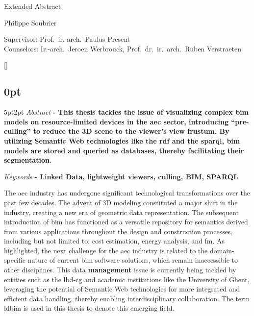 \begin{center}
    \sffamily
    \huge Extended Abstract

    \Large Philippe Soubrier

    \normalsize
    Supervisor: Prof.\ ir.-arch.\ Paulus Present\\
    Counselors: Ir.-arch.\ Jeroen Werbrouck, Prof.\ dr.\ ir.\ arch.\ Ruben Verstraeten
\end{center}
\begin{refsection}
    []{}
    \begin{multicols}{2}
        \small
        \titlespacing\subsection{0pt}{5pt}{2pt}
        \emph{Abstract} \textbf{
            - This thesis tackles the issue of visualizing complex \ac{bim} models on resource-limited devices in the \ac{aec} sector, introducing \enquote{pre-culling} to reduce the 3D scene to the viewer's view frustum. By utilizing Semantic Web technologies like the \ac{rdf} and the \ac{sparql}, \ac{bim} models are stored and queried as databases, thereby facilitating their segmentation.
        }

        \emph{Keywords} \textbf{
            - Linked Data, lightweight viewers, culling, BIM, SPARQL
        }

        The \ac{aec} industry has undergone significant technological transformations over the past few decades. The advent of 3D modeling constituted a major shift in the industry, creating a new era of geometric data representation. The subsequent introduction of \ac{bim} has functioned as a versatile repository for semantics derived from various applications throughout the design and construction processes, including but not limited to: cost estimation, energy analysis, and \ac{fm}. As \cite{Werbrouck2018} highlighted, the next challenge for the \ac{aec} industry is related to the domain-specific nature of current \ac{bim} software solutions, which remain inaccessible to other disciplines. This data \textbf{management} issue is currently being tackled by entities such as the \ac{lbd-cg} and academic institutions like the University of Ghent, leveraging the potential of Semantic Web technologies for more integrated and efficient data handling, thereby enabling interdisciplinary collaboration. The term \ac{ldbim} is used in this thesis to denote this emerging field.


\end{multicols}
\end{refsection}
